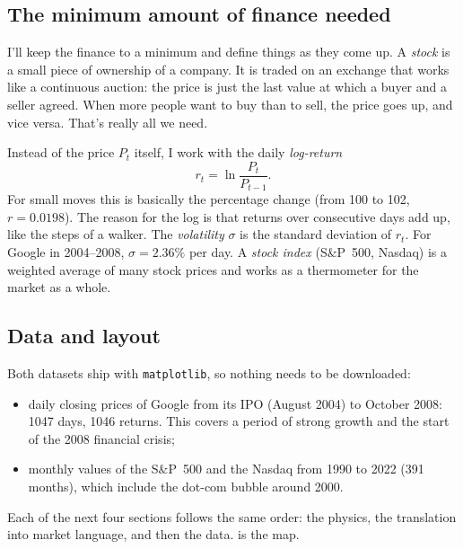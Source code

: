 \documentclass[11pt,a4paper]{article}
\begin{document}
\subsection{The minimum amount of finance needed}

I'll keep the finance to a minimum and define things as they come up. A \emph{stock} is a small piece of
ownership of a company. It is traded on an exchange that works like a continuous auction: the price is
just the last value at which a buyer and a seller agreed. When more people want to buy than to sell, the
price goes up, and vice versa. That's really all we need.

Instead of the price $P_t$ itself, I work with the daily \emph{log-return}
\begin{equation}
r_t=\ln\frac{P_t}{P_{t-1}} .
\end{equation}
For small moves this is basically the percentage change (from 100 to 102, $r=0.0198$). The reason for the
log is that returns over consecutive days add up, like the steps of a walker. The \emph{volatility}
$\sigma$ is the standard deviation of $r_t$. For Google in 2004--2008, $\sigma=2.36\%$ per day. A
\emph{stock index} (S\&P~500, Nasdaq) is a weighted average of many stock prices and works as a
thermometer for the market as a whole.

\subsection{Data and layout}

Both datasets ship with \texttt{matplotlib}, so nothing needs to be downloaded:
\begin{itemize}
\item daily closing prices of Google from its IPO (August 2004) to October 2008: 1047 days, 1046 returns.
This covers a period of strong growth and the start of the 2008 financial crisis;
\item monthly values of the S\&P~500 and the Nasdaq from 1990 to 2022 (391 months), which include the
dot-com bubble around 2000.
\end{itemize}
Each of the next four sections follows the same order: the physics, the translation into market language,
and then the data.  is the map.
\end{document}
